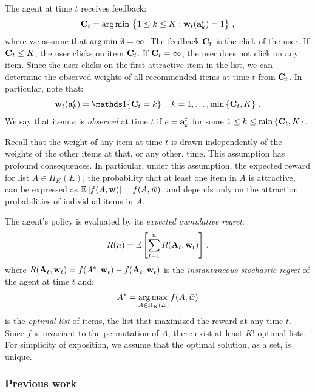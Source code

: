 The agent at time $t$ receives feedback:
\begin{align*}
  \mathbf{C}_t = \operatorname*{arg\,min\,} \left\{1 \leq k \leq K: \mathbf{w}_t(\mathbf{a}^t_k) = 1\right\}\,,
\end{align*}
where we assume that $\operatorname*{arg\,min\,} \emptyset = \infty$. The feedback $\mathbf{C}_t$ is the click of the user. If $\mathbf{C}_t \leq K$, the user clicks on item $\mathbf{C}_t$. If $\mathbf{C}_t = \infty$, the user does not click on any item. Since the user clicks on the first attractive item in the list, we can determine the observed weights of all recommended items at time $t$ from $\mathbf{C}_t$. In particular, note that:
\begin{align}
  \rnd{w}_t(\rnd{a}^t_k) = \I{\rnd{C}_t = k} \quad k = 1, \dots, \min \set{\rnd{C}_t, K}\,.
  \label{eq:click}
\end{align}
We say that item $e$ is \emph{observed} at time $t$ if $e = \mathbf{a}^t_k$ for some $1 \leq k \leq \min \left\{\mathbf{C}_t, K\right\}$.

Recall that the weight of any item at time $t$ is drawn independently of the weights of the other items at that, or any other, time. This assumption has profound consequences. In particular, under this assumption, the expected reward for list $A \in \Pi_K(E)$, the probability that at least one item in $A$ is attractive, can be expressed as $\mathbb{E} \left[f(A, \mathbf{w})\right] = f(A, \bar{w})$, and depends only on the attraction probabilities of individual items in $A$.

The agent's policy is evaluated by its \emph{expected cumulative regret}:
\begin{align*}
  R(n) = \mathbb{E} \left[\sum_{t = 1}^n R(\mathbf{A}_t, \mathbf{w}_t)\right]\,,
\end{align*}
where $R(\mathbf{A}_t, \mathbf{w}_t) = f(A^\ast, \mathbf{w}_t) - f(\mathbf{A}_t, \mathbf{w}_t)$ is the \emph{instantaneous stochastic regret} of the agent at time $t$ and:
\begin{align*}
  A^\ast = \operatorname*{arg\,max\,}_{A \in \Pi_K(E)} f(A, \bar{w})
\end{align*}
is the \emph{optimal list} of items, the list that maximized the reward at any time $t$. Since $f$ is invariant to the permutation of $A$, there exist at least $K!$ optimal lists. For simplicity of exposition, we assume that the optimal solution, as a set, is unique.

\subsubsection{Previous work}

